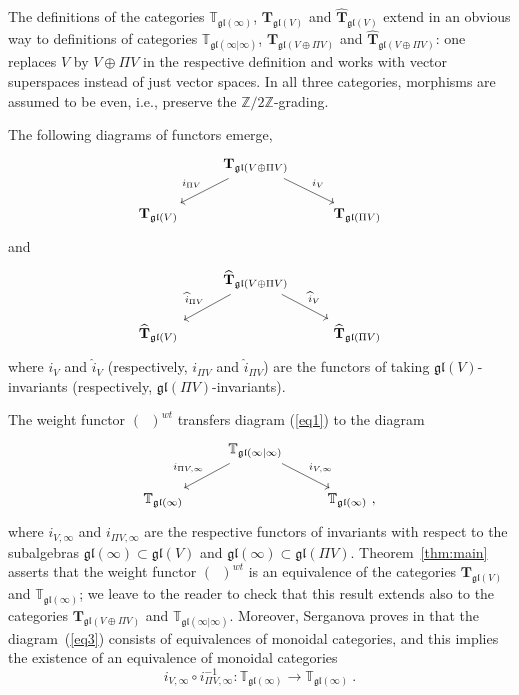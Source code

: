 \documentclass[12pt,reqno]{amsart}
\theoremstyle{definition}
\theoremstyle{remark}
\begin{document}
The definitions of the categories $\mathbb{T}_{\mathfrak{gl}(\infty)}$, $\mathbf{T}_{\mathfrak{gl}(V)}$ and $\widehat{\mathbf{T}}_{\mathfrak{gl}(V)}$ extend in an obvious way to definitions of categories $\mathbb{T}_{\mathfrak{gl}(\infty | \infty)}$, $\mathbf{T}_{\mathfrak{gl}(V \oplus \Pi V)}$ and $\widehat{\mathbf{T}}_{\mathfrak{gl}(V\oplus \Pi V)}$: one replaces $V$ by $V\oplus \Pi V$
in the respective definition and works with vector superspaces instead of just vector spaces.
In all three categories, morphisms are  assumed to be even, i.e., preserve the $\mathbb{Z}/2\mathbb{Z}$-grading.

The following diagrams of functors emerge,
\begin{equation}
\label{eq1}
\begin{tikzcd}
    & \mathbf{T}_{\mathfrak{gl}(V \oplus \Pi V)} \arrow[dl, "i_{\Pi V}"'] \arrow[dr, "i_V"]& \\
    \mathbf{T}_{\mathfrak{gl}(V)} & & \mathbf{T}_{\mathfrak{gl}(\Pi V)}
\end{tikzcd}  
\end{equation}
and
\begin{equation}
\label{eq2}
\begin{tikzcd}
    & \widehat{\mathbf{T}}_{\mathfrak{gl}(V\oplus \Pi V)} \arrow[dl, "\widehat{i}_{\Pi V}"'] \arrow[dr, "\widehat{i}_V"]& \\
    \widehat{\mathbf{T}}_{\mathfrak{gl}(V)}& & \widehat{\mathbf{T}}_{\mathfrak{gl}(\Pi V)}
\end{tikzcd}  
\end{equation}
where $i_V$ and $\widehat{i}_V$ (respectively, $i_{\Pi V}$ and $\widehat{i}_{\Pi V}$) are the functors of taking $\mathfrak{gl}(V)$-invariants (respectively, $\mathfrak{gl}(\Pi V)$-invariants).

The weight functor $(\phantom{a})^{wt}$ transfers diagram (\ref{eq1}) to the diagram
\begin{equation}
\label{eq3}
\begin{tikzcd}
    & \mathbb{T}_{\mathfrak{gl}(\infty | \infty)} \arrow[dl, "i_{\Pi V, \infty}"'] \arrow[dr, "i_{V, \infty}"]& \\
    \mathbb{T}_{\mathfrak{gl}(\infty)} & & \mathbb{T}_{\mathfrak{gl}(\infty)} \ ,
\end{tikzcd}  
\end{equation}
where $i_{V, \infty}$ and $i_{\Pi V, \infty}$ are the respective functors of invariants with respect to the subalgebras 
$\mathfrak{gl}(\infty)\subset \mathfrak{gl}(V)$ and $\mathfrak{gl}(\infty)\subset \mathfrak{gl}(\Pi V)$.
Theorem~\ref{thm:main} asserts that the weight functor $(\phantom{a})^{wt}$ is an equivalence of the categories $\mathbf{T}_{\mathfrak{gl}(V)}$
and $\mathbb{T}_{\mathfrak{gl}(\infty)}$; we leave to the reader to check that this result extends also to the categories
$\mathbf{T}_{\mathfrak{gl}(V \oplus \Pi V)}$ and $\mathbb{T}_{\mathfrak{gl}(\infty | \infty)}$. Moreover, Serganova proves in \cite{S} that the diagram~(\ref{eq3}) consists of equivalences of monoidal categories, and this implies the existence of an equivalence of monoidal categories
\[
i_{V, \infty} \circ i_{\Pi V, \infty}^{-1}: \mathbb{T}_{\mathfrak{gl}(\infty)} \rightarrow \mathbb{T}_{\mathfrak{gl}(\infty)} \ .
\]
\end{document}
